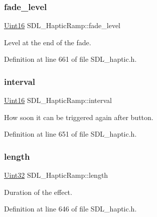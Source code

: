 \mbox{\label{struct_s_d_l___haptic_ramp_a66b586f2e6a23a085a7b2854f61752c5}} 
\subsubsection{\texorpdfstring{fade\_level}{fade\_level}}
{\footnotesize\ttfamily \mbox{\hyperlink{_s_d_l__stdinc_8h_a31fcc0a076c9068668173ee26d33e42b}{Uint16}} S\+D\+L\+\_\+\+Haptic\+Ramp\+::fade\+\_\+level}

Level at the end of the fade. 

Definition at line 661 of file S\+D\+L\+\_\+haptic.\+h.

\mbox{\label{struct_s_d_l___haptic_ramp_a4b89d108cfa7e96ea58b58771334c33d}} 
\subsubsection{\texorpdfstring{interval}{interval}}
{\footnotesize\ttfamily \mbox{\hyperlink{_s_d_l__stdinc_8h_a31fcc0a076c9068668173ee26d33e42b}{Uint16}} S\+D\+L\+\_\+\+Haptic\+Ramp\+::interval}

How soon it can be triggered again after button. 

Definition at line 651 of file S\+D\+L\+\_\+haptic.\+h.

\mbox{\label{struct_s_d_l___haptic_ramp_a57e75237507701405af2a3caf34cdb5a}} 
\subsubsection{\texorpdfstring{length}{length}}
{\footnotesize\ttfamily \mbox{\hyperlink{_s_d_l__stdinc_8h_add440eff171ea5f55cb00c4a9ab8672d}{Uint32}} S\+D\+L\+\_\+\+Haptic\+Ramp\+::length}

Duration of the effect. 

Definition at line 646 of file S\+D\+L\+\_\+haptic.\+h.

\mbox{\label{struct_s_d_l___haptic_ramp_acc0e813ac6399290fd4a788d2471e8d4}} 
